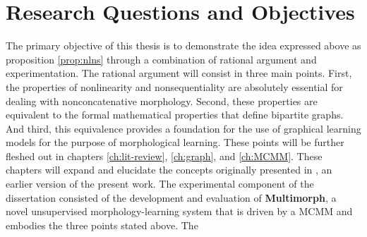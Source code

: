 \section{Research Questions and Objectives}
The primary objective of this thesis is to demonstrate the idea expressed above as proposition \ref{prop:nlns} through a combination of rational argument and experimentation.
The rational argument will consist in three main points.
First, the properties of nonlinearity and nonsequentiality are absolutely essential for dealing with nonconcatenative morphology.
Second, these properties are equivalent to the formal mathematical properties that define bipartite graphs. And third, this equivalence provides a foundation for the use of graphical learning models for the purpose of morphological learning. 
These points will be further fleshed out in chapters \ref{ch:lit-review}, \ref{ch:graph}, and \ref{ch:MCMM}. These chapters will expand and elucidate the concepts originally presented in \citep{meyer-and-dickinson:2016}, an earlier version of the present work.
The experimental component of the dissertation consisted of the development and evaluation of
 \textbf{Multimorph}, a novel unsupervised morphology-learning system that is driven by a \ac{MCMM} \citep{saund:94} and embodies the three points stated above. The 
	
